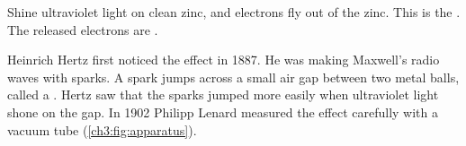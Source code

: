 \begin{keywords}
\end{keywords}

Shine ultraviolet light on clean zinc, and electrons fly out of the zinc. This is
the . The released electrons are .

Heinrich Hertz first noticed the effect in 1887. He was making Maxwell's radio waves
with sparks. A spark jumps across a small air gap between two metal balls, called a
. Hertz saw that the sparks jumped more easily when ultraviolet light
shone on the gap. In 1902 Philipp Lenard measured the effect carefully with a vacuum
tube (\cref{ch3:fig:apparatus}).

